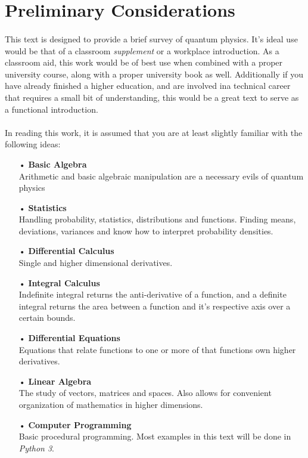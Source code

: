 \documentclass[12pt,letterpaper]{book}
\begin{document}

\section*{Preliminary Considerations}

\paragraph*{}This text is designed to provide a brief survey of quantum physics. It's ideal use would be that of a classroom \textit{supplement} or a workplace introduction. As a classroom aid, this work would be of best use when combined with a proper university course, along with a proper university book as well. Additionally if you have already finished a higher education, and are involved ina technical career that requires a small bit of understanding, this would be a great text to serve as a functional introduction.

\paragraph*{}In reading this work, it is assumed that you are at least slightly familiar with the following ideas:

\begin{enumerate}
\item[•]\textbf{Basic Algebra}\\
Arithmetic and basic algebraic manipulation are a necessary evils of quantum physics
\item[•]\textbf{Statistics}\\
Handling probability, statistics, distributions and functions. Finding means, deviations, variances and know how to interpret probability densities.
\item[•]\textbf{Differential Calculus}\\
Single and higher dimensional derivatives.
\item[•]\textbf{Integral Calculus}\\
Indefinite integral returns the anti-derivative of a function, and a definite integral returns the area between a function and it's respective axis over a certain bounds.
\item[•]\textbf{Differential Equations}\\
Equations that relate functions to one or more of that functions own higher derivatives.
\item[•]\textbf{Linear Algebra}\\
The study of vectors, matrices and spaces. Also allows for convenient organization of mathematics in higher dimensions.
\item[•]\textbf{Computer Programming}\\
Basic procedural programming. Most examples in this text will be done in \textit{Python 3}.
\end{enumerate}
\end{document}
